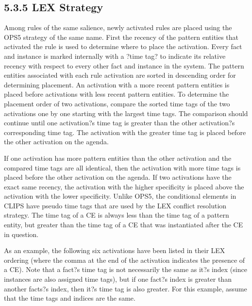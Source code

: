 \documentclass[letterpaper,10pt,english]{sphinxmanual}
\begin{document}
\subsection{5.3.5 LEX Strategy}
\label{\detokenize{defrule:lex-strategy}}
Among rules of the same salience, newly activated rules are placed using
the OPS5 strategy of the same name. First the recency of the pattern
entities that activated the rule is used to determine where to place the
activation. Every fact and instance is marked internally with a ?time
tag? to indicate its relative recency with respect to every other fact
and instance in the system. The pattern entities associated with each
rule activation are sorted in descending order for determining
placement. An activation with a more recent pattern entities is placed
before activations with less recent pattern entities. To determine the
placement order of two activations, compare the sorted time tags of the
two activations one by one starting with the largest time tags. The
comparison should continue until one activation?s time tag is greater
than the other activation?s corresponding time tag. The activation with
the greater time tag is placed before the other activation on the
agenda.

If one activation has more pattern entities than the other activation
and the compared time tags are all identical, then the activation with
more time tags is placed before the other activation on the agenda. If
two activations have the exact same recency, the activation with the
higher specificity is placed above the activation with the lower
specificity. Unlike OPS5, the  conditional elements in CLIPS have
pseudo time tags that are used by the LEX conflict resolution strategy.
The time tag of a  CE is always less than the time tag of a pattern
entity, but greater than the time tag of a  CE that was
instantiated after the  CE in question.

As an example, the following six activations have been listed in their
LEX ordering (where the comma at the end of the activation indicates the
presence of a  CE). Note that a fact?s time tag is not necessarily
the same as it?s index (since instances are also assigned time tags),
but if one fact?s index is greater than another facts?s index, then it?s
time tag is also greater. For this example, assume that the time tags
and indices are the same.
\end{document}
